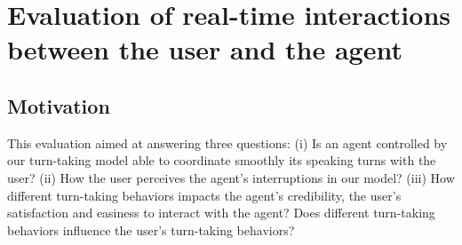 \section{Evaluation of real-time interactions between the user and the agent}
\label{sec:eval}


\subsection{Motivation}
\label{subsec:mot}

This evaluation aimed at answering three questions: 
(i) Is an agent controlled by our turn-taking model able to coordinate smoothly its speaking turns with the user?
(ii) How the user perceives the agent's interruptions in our model?
(iii) How different turn-taking behaviors impacts the agent's credibility, the user's satisfaction and easiness to interact with the agent? Does different turn-taking behaviors influence the user's turn-taking behaviors? 


